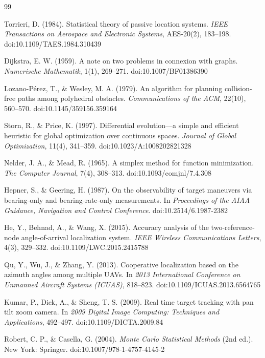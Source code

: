 \documentclass[12pt]{article}
\begin{document}
\begin{thebibliography}{99}
\small

Torrieri, D. (1984). Statistical theory of passive location systems. \emph{IEEE Transactions on Aerospace and Electronic Systems}, AES-20(2), 183--198. doi:10.1109/TAES.1984.310439

Dijkstra, E. W. (1959). A note on two problems in connexion with graphs. \emph{Numerische Mathematik}, 1(1), 269--271. doi:10.1007/BF01386390

Lozano-P\'erez, T., \& Wesley, M. A. (1979). An algorithm for planning collision-free paths among polyhedral obstacles. \emph{Communications of the ACM}, 22(10), 560--570. doi:10.1145/359156.359164

Storn, R., \& Price, K. (1997). Differential evolution---a simple and efficient heuristic for global optimization over continuous spaces. \emph{Journal of Global Optimization}, 11(4), 341--359. doi:10.1023/A:1008202821328

Nelder, J. A., \& Mead, R. (1965). A simplex method for function minimization. \emph{The Computer Journal}, 7(4), 308--313. doi:10.1093/comjnl/7.4.308

Hepner, S., \& Geering, H. (1987). On the observability of target maneuvers via bearing-only and bearing-rate-only measurements. In \emph{Proceedings of the AIAA Guidance, Navigation and Control Conference}. doi:10.2514/6.1987-2382

He, Y., Behnad, A., \& Wang, X. (2015). Accuracy analysis of the two-reference-node angle-of-arrival localization system. \emph{IEEE Wireless Communications Letters}, 4(3), 329--332. doi:10.1109/LWC.2015.2415788

Qu, Y., Wu, J., \& Zhang, Y. (2013). Cooperative localization based on the azimuth angles among multiple UAVs. In \emph{2013 International Conference on Unmanned Aircraft Systems (ICUAS)}, 818--823. doi:10.1109/ICUAS.2013.6564765

Kumar, P., Dick, A., \& Sheng, T. S. (2009). Real time target tracking with pan tilt zoom camera. In \emph{2009 Digital Image Computing: Techniques and Applications}, 492--497. doi:10.1109/DICTA.2009.84

Robert, C. P., \& Casella, G. (2004). \emph{Monte Carlo Statistical Methods} (2nd ed.). New York: Springer. doi:10.1007/978-1-4757-4145-2


\end{thebibliography}
\end{document}
